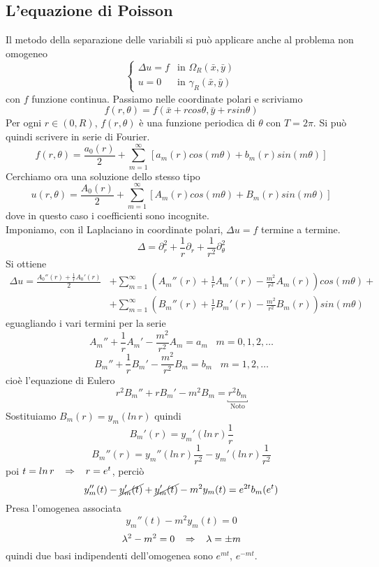 \subsection{L'equazione di Poisson}
Il metodo della separazione delle variabili si pu\`o applicare anche al 
problema non omogeneo
\[
	\left\{
	\begin{array}{ll}
		\Delta u= f	& \text{in } \Omega_R(\bar{x}, \bar{y}) \\
		u=0		& \text{in } \gamma_R(\bar{x}, \bar{y})
	\end{array}
	\right.
\]
con $f$ funzione continua. Passiamo nelle coordinate polari e scriviamo
\[
	f(r, \theta)= f(\bar{x}+rcos \theta, \bar{y}+ rsin \theta)
\]
Per ogni $r \in (0,R)$, $f(r, \theta)$ \`e una funzione periodica di $\theta$
con $T=2\pi$. Si pu\`o quindi scrivere in serie di Fourier.
\[
	f(r,\theta)= 	\frac{a_0(r)}{2}+  \sum_{m=1}^{\infty} \left[
	a_m (r) cos (m \theta)+
	b_m(r) sin (m\theta) 	
	\right]	
\]
Cerchiamo ora una soluzione dello stesso tipo
\[
	u(r,\theta)= 	\frac{A_0(r)}{2}+  \sum_{m=1}^{\infty} \left[
	A_m (r) cos (m \theta)+
	B_m(r) sin (m\theta) 	
	\right]	
\]
dove in questo caso i coefficienti sono incognite.\\
Imponiamo, con il Laplaciano in coordinate polari, $\Delta u= f$ termine
a termine.
\[
	\Delta = \partial_r^2 +\frac{1}{r}\partial_r + \frac{1}{r^2}\partial_{\theta}^2
\]
Si ottiene
\begin{align*}
	\Delta u = \frac{A_0''(r)+ \frac{1}{r}A_0'(r)}{2} &+
	\sum_{m=1}^{\infty} \left(
	A_m''(r) + \frac{1}{r} A_m'(r) -\frac{m^2}{r^2}A_m(r)
	\right)cos(m\theta) + \\
	&+ \sum_{m=1}^{\infty} \left(
	B_m''(r) + \frac{1}{r} B_m'(r) -\frac{m^2}{r^2}B_m(r)
	\right) sin (m\theta)
\end{align*}
eguagliando i vari termini per la serie
\[
	A_m'' + \frac{1}{r} A_m'-\frac{m^2}{r^2} A_m= a_m \;\;\;m=0,1,2,\ldots
\]
\[
	B_m'' + \frac{1}{r} B_m'-\frac{m^2}{r^2} B_m= b_m \;\;\;m=1,2,\ldots
\]
cio\`e l'equazione di Eulero
\[
	r^2 B_m'' + rB_m' - m^2B_m= \underbracket{r^2b_m}_{\text{Noto}}
\]
Sostituiamo $B_m(r)= y_m(ln \, r)$ quindi
\[
	B_m'(r)= y_m'(ln \, r)\frac{1}{r}
\]
\[
	B_m''(r)= y_m''(ln \, r)\frac{1}{r^2}- y_m'(ln \, r)\frac{1}{r^2}
\]
poi $t=ln \, r \;\;\; \Rightarrow \;\;\; r=e^t$, perci\`o
\[
	y_m''(t)- \cancel{y_m'(t)} + \cancel{y_m'(t)} - m^2 y_m(t)= e^{2t}b_m(e^t)
\]
Presa l'omogenea associata
\[
	y_m''(t) - m^2 y_m(t)=0
\]
\[
	\lambda^2 - m^2 =0 \;\;\; \Rightarrow \;\;\; \lambda= \pm m
\]
quindi due basi indipendenti dell'omogenea sono $e^{mt}$, $e^{-mt}$.\\
